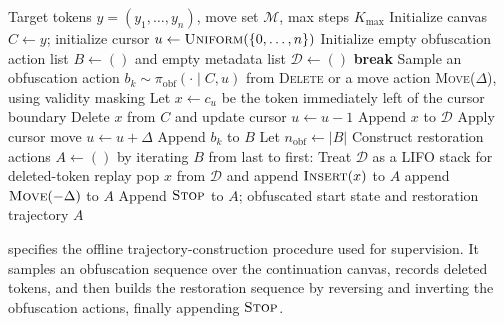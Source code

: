 \documentclass[11pt]{article}
\DeclareRobustCommand{\ph}[1]{#1}
\DeclareRobustCommand{\phA}{A}
\DeclareRobustCommand{\ph}[1]{\ifmmode\text{\phoenicianfont #1}\else{\phoenicianfont #1}\fi}
\DeclareRobustCommand{\phA}{\ph{\char"10900}} %
\DeclareRobustCommand{\ph}[1]{#1}
\DeclareRobustCommand{\phA}{A}
\DeclareRobustCommand{\Stop}{\ifmmode\text{\textsc{Stop}}\else\textsc{Stop}\fi}
\DeclareRobustCommand{\Insert}{\ifmmode\text{\textsc{Insert}}\else\textsc{Insert}\fi}
\DeclareRobustCommand{\Move}{\ifmmode\text{\textsc{Move}}\else\textsc{Move}\fi}
\DeclareRobustCommand{\Delete}{\ifmmode\text{\textsc{Delete}}\else\textsc{Delete}\fi}
\newcommand{\Mset}{\mathcal{M}}
\begin{document}
\begin{algorithm}[t]
\caption{Obfuscation--restoration trajectory generation (primary implementation)}
\label{alg:obf_restore}
\begin{algorithmic}[1]
\Require Target tokens $y=(y_1,\dots,y_n)$, move set $\Mset$, max steps $K_{\max}$
\State Initialize canvas $C \leftarrow y$; initialize cursor $u \leftarrow \textsc{Uniform}(\{0,\dots,n\})$
\State Initialize empty obfuscation action list $B \leftarrow ()$ and empty metadata list $\mathcal{D}\leftarrow()$
 \textbf{break} \EndIf
\State Sample an obfuscation action $b_k \sim \pi_{\text{obf}}(\cdot \mid C,u)$ from \textsc{Delete} or a move action \Move($\Delta$), using validity masking
\If{$b_k = \Delete$}
\State Let $x \leftarrow c_{u}$ be the token immediately left of the cursor boundary
\State Delete $x$ from $C$ and update cursor $u \leftarrow u-1$
\State Append $x$ to $\mathcal{D}$
\Else
\State Apply cursor move $u \leftarrow u+\Delta$
\EndIf
\State Append $b_k$ to $B$
\EndFor
\State Let $n_{\text{obf}} \leftarrow |B|$
\State Construct restoration actions $\phA\leftarrow()$ by iterating $B$ from last to first:
\State Treat $\mathcal{D}$ as a LIFO stack for deleted-token replay
 \State pop $x$ from $\mathcal{D}$ and append $\Insert(x)$ to $\phA$
\Else \State append $\Move(-\Delta)$ to $\phA$
\EndIf
\EndFor
\State Append $\Stop$ to $\phA$; \Return obfuscated start state and restoration trajectory $\phA$
\end{algorithmic}
\end{algorithm}

 specifies the offline trajectory-construction procedure used for supervision. It samples an obfuscation sequence over the continuation canvas, records deleted tokens, and then builds the restoration sequence by reversing and inverting the obfuscation actions, finally appending $\Stop$.
\end{document}
